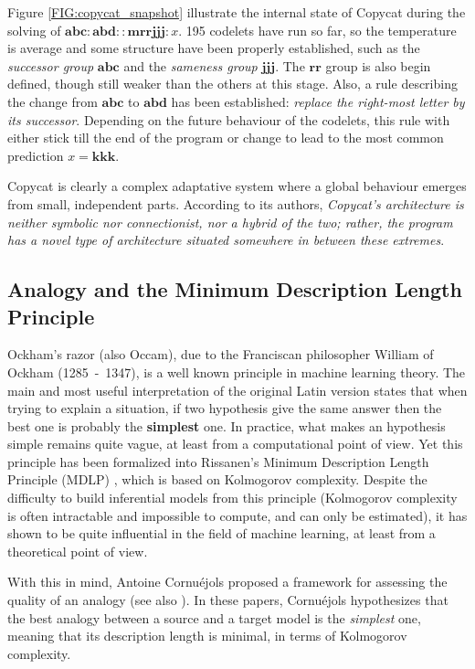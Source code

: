 Figure \ref{FIG:copycat_snapshot} illustrate the internal state of Copycat
during the solving of $\mathbf{abc} : \mathbf{abd} :: \mathbf{mrrjjj}: x$. 195
codelets have run so far, so the temperature is average and some structure have
been properly established, such as the \textit{successor group} $\mathbf{abc}$
and the \textit{sameness group} $\mathbf{jjj}$. The $\mathbf{rr}$ group is also
begin defined, though still weaker than the others at this stage. Also, a rule
describing the change from $\mathbf{abc}$ to $\mathbf{abd}$ has been
established: \textit{replace the right-most letter by its successor}. Depending
on the future behaviour of the codelets, this rule with either stick till the
end of the program or change to lead to the most common prediction $x =
\mathbf{kkk}$.

Copycat is clearly a complex adaptative system where a global behaviour emerges
from small, independent parts. According to its authors, \textit{Copycat's
architecture is neither symbolic nor connectionist, nor a hybrid of the two;
rather, the program has a novel type of architecture situated somewhere in
between these extremes}.

\subsection{Analogy and the Minimum Description Length Principle}

Ockham's razor (also Occam), due to the Franciscan philosopher William
of Ockham (1285~-~1347), is a well known principle in machine learning theory.
The main and most useful interpretation of the original Latin version states
that when trying to explain a situation, if two hypothesis give the same answer
then the best one is probably the \textbf{simplest} one. In practice, what
makes an hypothesis simple remains quite vague, at least from a computational
point of view. Yet this principle has been formalized into Rissanen's Minimum
Description Length Principle (MDLP) \cite{Ris78}, which is based on Kolmogorov
complexity. Despite the difficulty to build inferential models from this
principle (Kolmogorov complexity is often intractable and impossible to
compute, and can only be estimated), it has shown to be quite influential in
the field of machine learning, at least from a theoretical point of view.

With this in mind, Antoine Cornuéjols proposed a framework for assessing the
quality of an analogy \cite{CorMLS96} (see also \cite{CorJFA96}). In these
papers, Cornuéjols hypothesizes that the best analogy between a source and a
target model is the \textit{simplest} one, meaning that its description length
is minimal, in terms of Kolmogorov complexity.

